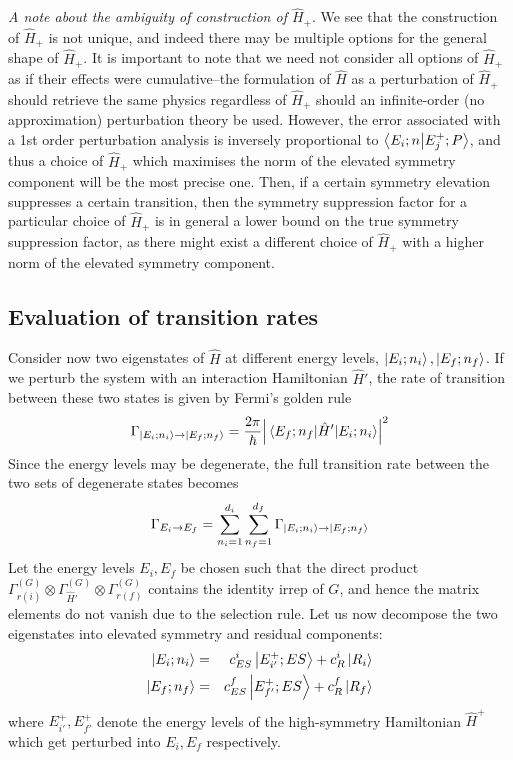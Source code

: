 \documentclass[12pt]{article}
\begin{document}
	\textit{A note about the ambiguity of construction of $\hat{H}_+$}. We see that the construction of $\hat{H}_+$ is not unique, and indeed there may be multiple options for the general shape of $\hat{H}_+$. It is important to note that we need not consider all options of $\hat{H}_+$ as if their effects were cumulative--the formulation of $\hat{H}$ as a perturbation of $\hat{H}_+$ should retrieve the same physics regardless of $\hat{H}_+$ should an infinite-order (no approximation) perturbation theory be used. However, the error associated with a 1st order perturbation analysis is inversely proportional to $\braket{E_i;n}{E_j^+;P}$, and thus a choice of $\hat{H}_+$ which maximises the norm of the elevated symmetry component will be the most precise one. Then, if a certain symmetry elevation suppresses a certain transition, then the symmetry suppression factor for a particular choice of $\hat{H}_+$ is in general a lower bound on the true symmetry suppression factor, as there might exist a different choice of $\hat{H}_+$ with a higher norm of the elevated symmetry component.
	
	\subsection{Evaluation of transition rates}
	
	Consider now two eigenstates of $\hat{H}$ at different energy levels, $\ket{E_i;n_i},\ket{E_f;n_f}$. If we perturb the system with an interaction Hamiltonian $\hat{H}'$, the rate of transition between these two states is given by Fermi's golden rule
	$$\Gamma_{\ket{E_i;n_i}\to \ket{E_f;n_f}}=\frac{2\pi}{\hbar}\abs{\mel{E_f;n_f}{\hat{H}'}{E_i;n_i}}^2$$
	Since the energy levels may be degenerate, the full transition rate between the two sets of degenerate states becomes
	$$\Gamma_{E_i\to E_f}=\sum_{n_i=1}^{d_i}\sum_{n_f=1}^{d_f}\Gamma_{\ket{E_i;n_i}\to \ket{E_f;n_f}}$$
	Let the energy levels $E_i,E_f$ be chosen such that the direct product $\Gamma^{(G)}_{r(i)}\otimes \Gamma^{(G)}_{\hat{H}'}\otimes \Gamma^{(G)}_{r(f)}$ contains the identity irrep of $G$, and hence the matrix elements do not vanish due to the selection rule. Let us now decompose the two eigenstates into elevated symmetry and residual components:
	\begin{eqnarray*}
	\ket{E_i;n_i}&=&c_{ES}^i\ket{E_{i'}^+;ES}+c_R^i\ket{R_i}\\
	\ket{E_f;n_f}&=&c_{ES}^f\ket{E_{f'}^+;ES}+c_R^f\ket{R_f}
	\end{eqnarray*}
	where $E_{i'}^+,E_{f'}^+$ denote the energy levels of the high-symmetry Hamiltonian $\hat{H}^+$ which get perturbed into $E_i,E_f$ respectively.
	
\end{document}
